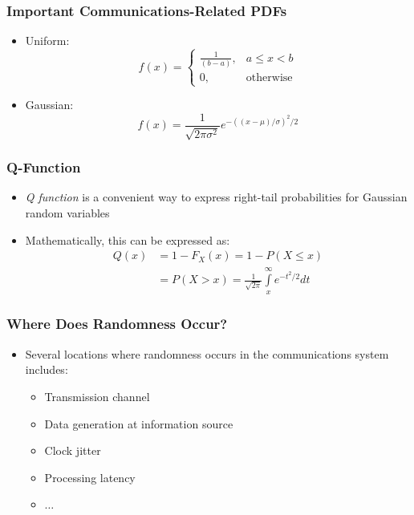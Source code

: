 \documentclass[10pt]{beamer}
\begin{document}
\frame
{
  \frametitle{Important Communications-Related PDFs}

  \begin{itemize}
   \item Uniform:
   \begin{equation}
    f(x)=\begin{cases}
          \frac{1}{(b-a)},&a\le{x}<{b}\\
          0,&\mathrm{otherwise}
         \end{cases}
   \end{equation}
   \item Gaussian:
   \begin{equation}
    f(x)=\frac{1}{\sqrt{2\pi{\sigma^2}}}e^{-((x-\mu)/\sigma)^2/2}
   \end{equation}
  \end{itemize}

  }




\frame
{
  \frametitle{Q-Function}

  \begin{itemize}
   \item \textit{Q function} is a convenient way to express right-tail probabilities for Gaussian random variables
   \item Mathematically, this can be expressed as:
   \begin{eqnarray}
    Q(x)&=1-F_X(x)=1-P(X\le{x})\\
    &=P(X>x)=\frac{1}{\sqrt{2\pi}}\int\limits_{x}^{\infty}e^{-t^2/2}dt
   \end{eqnarray}
  \end{itemize}

  }



\frame
{
  \frametitle{Where Does Randomness Occur?}

  \begin{itemize}
   \item Several locations where randomness occurs in the communications system includes:
   \begin{itemize}
    \item Transmission channel
    \item Data generation at information source
    \item Clock jitter
    \item Processing latency
    \item $\ldots$
   \end{itemize}

  \end{itemize}


  }
\end{document}
